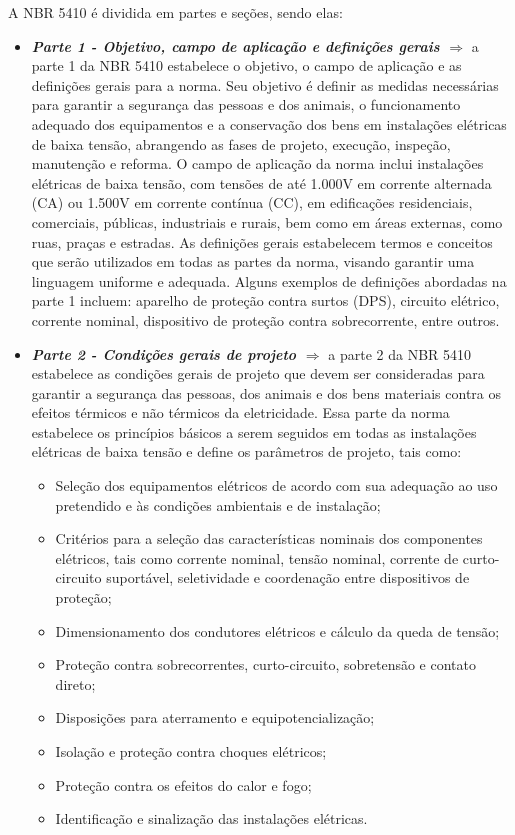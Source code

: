 \documentclass[a4paper, 12pt, onecolumn,singlespacing]{article}
\begin{document}
		A NBR 5410 é dividida em partes e seções, sendo elas:
		
		\begin{itemize}
			\item \textbf{\textit{Parte 1 - Objetivo, campo de aplicação e definições gerais $\Rightarrow$ }}a parte 1 da NBR 5410 estabelece o objetivo, o campo de aplicação e as definições gerais para a norma. Seu objetivo é definir as medidas necessárias para garantir a segurança das pessoas e dos animais, o funcionamento adequado dos equipamentos e a conservação dos bens em instalações elétricas de baixa tensão, abrangendo as fases de projeto, execução, inspeção, manutenção e reforma. O campo de aplicação da norma inclui instalações elétricas de baixa tensão, com tensões de até 1.000V em corrente alternada (CA) ou 1.500V em corrente contínua (CC), em edificações residenciais, comerciais, públicas, industriais e rurais, bem como em áreas externas, como ruas, praças e estradas. As definições gerais estabelecem termos e conceitos que serão utilizados em todas as partes da norma, visando garantir uma linguagem uniforme e adequada. Alguns exemplos de definições abordadas na parte 1 incluem: aparelho de proteção contra surtos (DPS), circuito elétrico, corrente nominal, dispositivo de proteção contra sobrecorrente, entre outros.
			\item \textbf{\textit{Parte 2 - Condições gerais de projeto $\Rightarrow$ }}a parte 2 da NBR 5410 estabelece as condições gerais de projeto que devem ser consideradas para garantir a segurança das pessoas, dos animais e dos bens materiais contra os efeitos térmicos e não térmicos da eletricidade. Essa parte da norma estabelece os princípios básicos a serem seguidos em todas as instalações elétricas de baixa tensão e define os parâmetros de projeto, tais como:
			\begin{itemize}
				\item Seleção dos equipamentos elétricos de acordo com sua adequação ao uso pretendido e às condições ambientais e de instalação;
				\item Critérios para a seleção das características nominais dos componentes elétricos, tais como corrente nominal, tensão nominal, corrente de curto-circuito suportável, seletividade e coordenação entre dispositivos de proteção;
				\item Dimensionamento dos condutores elétricos e cálculo da queda de tensão;
				\item Proteção contra sobrecorrentes, curto-circuito, sobretensão e contato direto;
				\item Disposições para aterramento e equipotencialização;
				\item Isolação e proteção contra choques elétricos;
				\item Proteção contra os efeitos do calor e fogo;
				\item Identificação e sinalização das instalações elétricas.
			\end{itemize}
			

\end{itemize}
\end{document}
